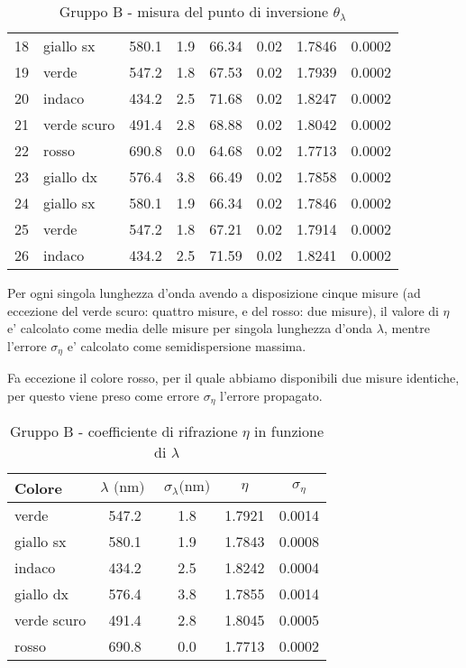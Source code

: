 \begin{table}[!htbp]
{\begin{tabular}{clcccrcc}
        18  &   giallo sx    &   580.1  & 1.9 &  66.34 &   0.02  & 1.7846 & 0.0002  \\
        19  &   verde        &   547.2  & 1.8 &  67.53 &   0.02  & 1.7939 & 0.0002  \\
        20  &   indaco       &   434.2  & 2.5 &  71.68 &   0.02  & 1.8247 & 0.0002  \\
        21  &   verde scuro  &   491.4  & 2.8 &  68.88 &   0.02  & 1.8042 & 0.0002  \\
        22  &   rosso        &   690.8  & 0.0 &  64.68 &   0.02  & 1.7713 & 0.0002  \\
        23  &   giallo dx    &   576.4  & 3.8 &  66.49 &   0.02  & 1.7858 & 0.0002  \\
        24  &   giallo sx    &   580.1  & 1.9 &  66.34 &   0.02  & 1.7846 & 0.0002  \\
        25  &   verde        &   547.2  & 1.8 &  67.21 &   0.02  & 1.7914 & 0.0002  \\
        26  &   indaco       &   434.2  & 2.5 &  71.59 &   0.02  & 1.8241 & 0.0002  \\
        \hline
    \end{tabular}
    \par}
    \caption{Gruppo B - misura del punto di inversione $\theta_{\lambda}$}
\end{table}

Per ogni singola lunghezza d'onda avendo a disposizione cinque misure (ad eccezione del verde scuro: quattro misure, e del rosso: due misure), il valore di $\eta$ e' calcolato come media delle misure per singola lunghezza d'onda $\lambda$, mentre l'errore $\sigma_{\eta}$ e' calcolato come semidispersione massima.

Fa eccezione il colore rosso, per il quale abbiamo disponibili due misure identiche, per questo viene preso come errore $\sigma_{\eta}$ l'errore propagato.

\begin{table}[!htbp]
    {\par\centering
    \begin{tabular}{lcccc}
        \hline
            Colore & 
            $\lambda \text{ (nm) }$ &
            $\sigma_{\lambda} \text{(nm)}$ & 
            $\eta$ &
            $\sigma_{\eta}$ \\
        \hline
        verde        &   547.2  & 1.8 &  1.7921 &   0.0014 \\
        giallo sx    &   580.1  & 1.9 &  1.7843 &   0.0008 \\
        indaco       &   434.2  & 2.5 &  1.8242 &   0.0004 \\
        giallo dx    &   576.4  & 3.8 &  1.7855 &   0.0014 \\
        verde scuro  &   491.4  & 2.8 &  1.8045 &   0.0005 \\
        rosso        &   690.8  & 0.0 &  1.7713 &   0.0002 \\
        \hline
    \end{tabular}
    \par}
    \caption{Gruppo B - coefficiente di rifrazione $\eta$ in funzione di $\lambda$}
\end{table}

